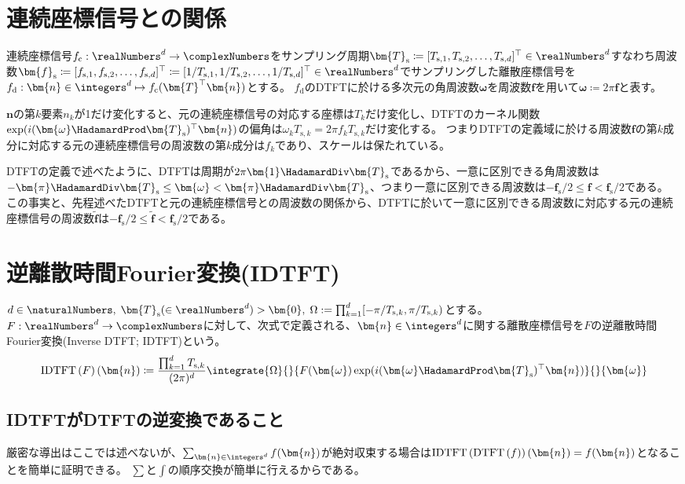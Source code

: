 		\section{連続座標信号との関係}
			連続座標信号$f_\text{c}:\realNumbers^d\to\complexNumbers$をサンプリング周期$\bm{T}_\text{s} \coloneqq [T_{\text{s},1}, T_{\text{s},2}, \dotsc, T_{\text{s},d}]^\top\in\realNumbers^d$すなわち周波数$\bm{f}_\text{s} \coloneqq [f_{\text{s},1}, f_{\text{s},2}, \dotsc, f_{\text{s},d}]^\top \coloneqq [1/T_{\text{s},1}, 1/T_{\text{s},2}, \dotsc, 1/T_{\text{s},d}]^\top\in\realNumbers^d$でサンプリングした離散座標信号を$f_\text{d}: \bm{n}\in\integers^d\mapsto f_\text{c}(\bm{T}^\top\bm{n})$とする。
			$f_\text{d}$のDTFTに於ける多次元の角周波数$\bm{\omega}$を周波数$\bm{f}$を用いて$\bm{\omega} \coloneqq 2\pi\bm{f}$と表す。
			\par
			$\bm{n}$の第$k$要素$n_k$が1だけ変化すると、元の連続座標信号の対応する座標は$T_k$だけ変化し、DTFTのカーネル関数$\exp(i(\bm{\omega}\HadamardProd\bm{T}_\text{s})^\top\bm{n})$の偏角は$\omega_k T_{\text{s},k} = 2\pi f_k T_{\text{s},k}$だけ変化する。
			つまりDTFTの定義域に於ける周波数$\bm{f}$の第$k$成分に対応する元の連続座標信号の周波数の第$k$成分は$f_k$であり、スケールは保たれている。
			\par
			DTFTの定義で述べたように、DTFTは周期が$2\pi\bm{1}\HadamardDiv\bm{T}_\text{s}$であるから、一意に区別できる角周波数は$-\bm{\pi}\HadamardDiv\bm{T}_\text{s} \leq \bm{\omega} < \bm{\pi}\HadamardDiv\bm{T}_\text{s}$、つまり一意に区別できる周波数は$-\bm{f}_\text{s}/2 \leq \bm{f} < \bm{f}_\text{s}/2$である。
			この事実と、先程述べたDTFTと元の連続座標信号との周波数の関係から、DTFTに於いて一意に区別できる周波数に対応する元の連続座標信号の周波数$\tilde{\bm{f}}$は$-\bm{f}_\text{s}/2 \leq \tilde{\bm{f}} < \bm{f}_\text{s}/2$である。
		\section{逆離散時間Fourier変換(IDTFT)}
			$d\in\naturalNumbers,\;\bm{T}_\text{s}(\in\realNumbers^d)>\bm{0},\;\Omega := \prod_{k=1}^d [-\pi/T_{\text{s},k},\pi/T_{\text{s},k})$とする。
			$F:\realNumbers^d\to\complexNumbers$に対して、次式で定義される、$\bm{n}\in\integers^d$に関する離散座標信号を$F$の逆離散時間Fourier変換(Inverse DTFT; IDTFT)という。
			\[ \IDTFTwithArg{F}{\bm{n}} \coloneqq \frac{\prod_{k=1}^d T_{\text{s},k}}{(2\pi)^d}\integrate{\Omega}{}{F(\bm{\omega})\exp(i(\bm{\omega}\HadamardProd\bm{T}_\text{s})^\top\bm{n})}{}{\bm{\omega}} \]
			\subsection{IDTFTがDTFTの逆変換であること}
				厳密な導出はここでは述べないが、$\sum_{\bm{n}\in\integers^d} f(\bm{n})$が絶対収束する場合は$\IDTFTwithArg{\DTFT{f}}{\bm{n}} = f(\bm{n})$となることを簡単に証明できる。
				$\sum$と$\int$の順序交換が簡単に行えるからである。
